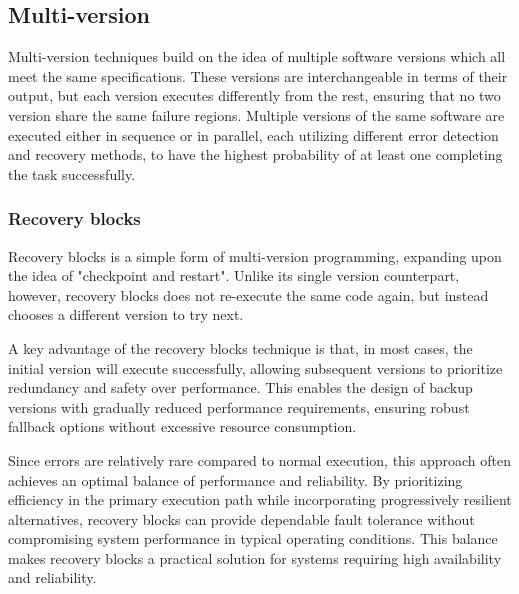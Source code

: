 \subsection{Multi-version} \label{multi}

Multi-version techniques build on the idea of multiple software versions which all meet the same specifications. These versions are interchangeable in terms of their output, but each version executes differently from the rest, ensuring that no two version share the same failure regions.
Multiple versions of the same software are executed either in sequence or in parallel, each utilizing different error detection and recovery methods, to have the highest probability of at least one completing the task successfully.

\subsubsection{Recovery blocks}

Recovery blocks is a simple form of multi-version programming, expanding upon the idea of "checkpoint and restart". Unlike its single version counterpart, however, recovery blocks does not re-execute the same code again, but instead chooses a different version to try next.

A key advantage of the recovery blocks technique is that, in most cases, the initial version will execute successfully, allowing subsequent versions to prioritize redundancy and safety over performance. This enables the design of backup versions with gradually reduced performance requirements, ensuring robust fallback options without excessive resource consumption.



Since errors are relatively rare compared to normal execution, this approach often achieves an optimal balance of performance and reliability. By prioritizing efficiency in the primary execution path while incorporating progressively resilient alternatives, recovery blocks can provide dependable fault tolerance without compromising system performance in typical operating conditions. This balance makes recovery blocks a practical solution for systems requiring high availability and reliability.

